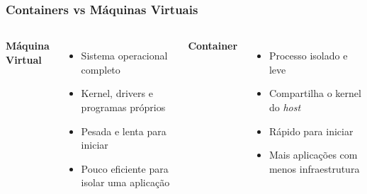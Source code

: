 \begin{frame}
  \frametitle{Containers vs Máquinas Virtuais}
  \begin{columns}
      \textbf{Máquina Virtual}
      \begin{itemize}
        \item Sistema operacional completo
        \item Kernel, drivers e programas próprios
        \item Pesada e lenta para iniciar
        \item Pouco eficiente para isolar uma aplicação
      \end{itemize}

      \textbf{Container}
      \begin{itemize}
        \item Processo isolado e leve
        \item Compartilha o kernel do \textit{host}
        \item Rápido para iniciar
        \item Mais aplicações com menos infraestrutura
      \end{itemize}
  \end{columns}
\end{frame}